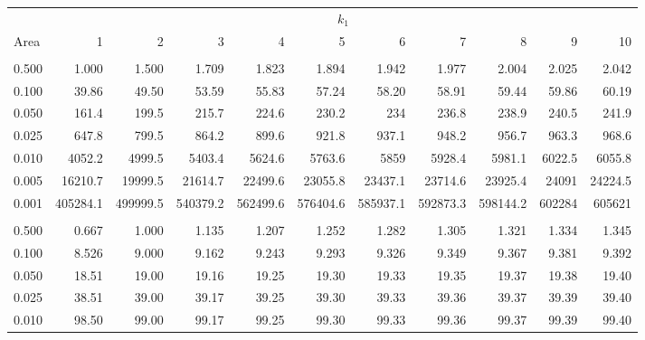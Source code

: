 \documentclass[
]{article}
\begin{document}
\begin{longtable}[t]{lrrrrrrrrrr}
\toprule
\multicolumn{1}{c}{ } & \multicolumn{10}{c}{$k_1$} \\
\cmidrule(l{3pt}r{3pt}){2-11}
Area & 1 & 2 & 3 & 4 & 5 & 6 & 7 & 8 & 9 & 10\\
\midrule
\addlinespace[0.3em]
\multicolumn{11}{l}{\textbf{$k_2=1$}}\\
\hspace{1em}0.500 & 1.000 & 1.500 & 1.709 & 1.823 & 1.894 & 1.942 & 1.977 & 2.004 & 2.025 & 2.042\\
\hspace{1em}0.100 & 39.86 & 49.50 & 53.59 & 55.83 & 57.24 & 58.20 & 58.91 & 59.44 & 59.86 & 60.19\\
\hspace{1em}0.050 & 161.4 & 199.5 & 215.7 & 224.6 & 230.2 & 234 & 236.8 & 238.9 & 240.5 & 241.9\\
\hspace{1em}0.025 & 647.8 & 799.5 & 864.2 & 899.6 & 921.8 & 937.1 & 948.2 & 956.7 & 963.3 & 968.6\\
\hspace{1em}0.010 & 4052.2 & 4999.5 & 5403.4 & 5624.6 & 5763.6 & 5859 & 5928.4 & 5981.1 & 6022.5 & 6055.8\\
\hspace{1em}0.005 & 16210.7 & 19999.5 & 21614.7 & 22499.6 & 23055.8 & 23437.1 & 23714.6 & 23925.4 & 24091 & 24224.5\\
\hspace{1em}0.001 & 405284.1 & 499999.5 & 540379.2 & 562499.6 & 576404.6 & 585937.1 & 592873.3 & 598144.2 & 602284 & 605621\\
\addlinespace[0.3em]
\multicolumn{11}{l}{\textbf{$k_2=2$}}\\
\hspace{1em}0.500 & 0.667 & 1.000 & 1.135 & 1.207 & 1.252 & 1.282 & 1.305 & 1.321 & 1.334 & 1.345\\
\hspace{1em}0.100 & 8.526 & 9.000 & 9.162 & 9.243 & 9.293 & 9.326 & 9.349 & 9.367 & 9.381 & 9.392\\
\hspace{1em}0.050 & 18.51 & 19.00 & 19.16 & 19.25 & 19.30 & 19.33 & 19.35 & 19.37 & 19.38 & 19.40\\
\hspace{1em}0.025 & 38.51 & 39.00 & 39.17 & 39.25 & 39.30 & 39.33 & 39.36 & 39.37 & 39.39 & 39.40\\
\hspace{1em}0.010 & 98.50 & 99.00 & 99.17 & 99.25 & 99.30 & 99.33 & 99.36 & 99.37 & 99.39 & 99.40\\

\end{longtable}
\end{document}
